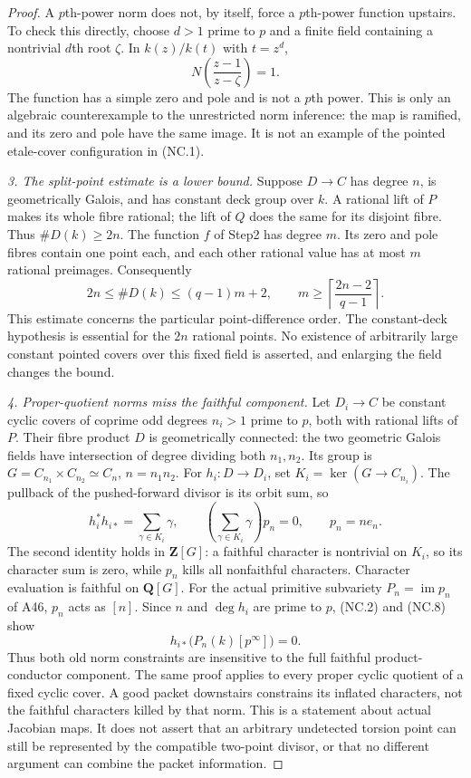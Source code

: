 \begin{proof}
A $p$th-power norm does not, by itself, force a $p$th-power
function upstairs. To check this directly, choose $d>1$
prime to $p$ and a finite field containing a nontrivial
$d$th root $\zeta$. In $k(z)/k(t)$ with $t=z^d$,
\[
                    N\!\left(\frac{z-1}{z-\zeta}\right)=1.
       \tag{NC.6}
\]
The function has a simple zero and pole and is not a $p$th
power. This is only an algebraic counterexample to the
unrestricted norm inference: the map is ramified, and its
zero and pole have the same image. It is not an example of
the pointed etale-cover configuration in (NC.1).

\emph{3. The split-point estimate is a lower bound.}
Suppose $D\to C$ has degree $n$, is geometrically Galois,
and has constant deck group over $k$. A rational lift of
$P$ makes its whole fibre rational; the lift of $Q$ does
the same for its disjoint fibre. Thus $\#D(k)\ge2n$.
The function $f$ of Step2 has degree $m$. Its zero and pole
fibres contain one point each, and each other rational value
has at most $m$ rational preimages. Consequently
\[
     2n\le\#D(k)\le(q-1)m+2,
     \qquad
     m\ge\left\lceil\frac{2n-2}{q-1}\right\rceil.
       \tag{NC.7}
\]
This estimate concerns the particular point-difference order.
The constant-deck hypothesis is essential for the $2n$
rational points. No existence of arbitrarily large constant
pointed covers over this fixed field is asserted, and
enlarging the field changes the bound.

\emph{4. Proper-quotient norms miss the faithful component.}
Let $D_i\to C$ be constant cyclic covers of coprime odd
degrees $n_i>1$ prime to $p$, both with rational lifts of $P$.
Their fibre product $D$ is geometrically connected: the two
geometric Galois fields have intersection of degree dividing
both $n_1,n_2$. Its group is
$G=C_{n_1}\times C_{n_2}\simeq C_n$, $n=n_1n_2$.
For $h_i:D\to D_i$, set $K_i=\ker(G\to C_{n_i})$.
The pullback of the pushed-forward divisor is its orbit sum,
so
\[
 h_i^*h_{i*}=\sum_{\gamma\in K_i}\gamma,
 \qquad
 \left(\sum_{\gamma\in K_i}\gamma\right)p_n=0,
 \qquad p_n=ne_n.
       \tag{NC.8}
\]
The second identity holds in $\mathbf Z[G]$: a faithful
character is nontrivial on $K_i$, so its character sum is
zero, while $p_n$ kills all nonfaithful characters.
Character evaluation is faithful on $\mathbf Q[G]$.
For the actual primitive subvariety $P_n=\operatorname{im}p_n$
of A46, $p_n$ acts as $[n]$. Since $n$ and $\deg h_i$ are
prime to $p$, (NC.2) and (NC.8) show
\[
                       h_{i*}\bigl(P_n(k)[p^\infty]\bigr)=0.
       \tag{NC.9}
\]
Thus both old norm constraints are insensitive to the full
faithful product-conductor component. The same proof applies
to every proper cyclic quotient of a fixed cyclic cover.
A good packet downstairs constrains its inflated characters,
not the faithful characters killed by that norm. This is a
statement about actual Jacobian maps. It does not assert that
an arbitrary undetected torsion point can still be represented
by the compatible two-point divisor, or that no different
argument can combine the packet information.


\end{proof}
